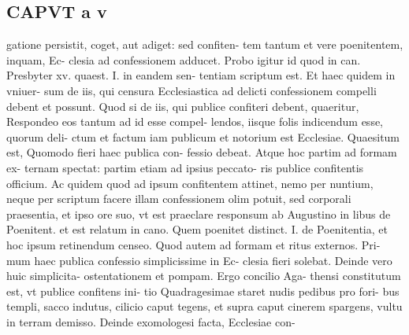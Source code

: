 \documentclass{article}
\begin{document}
\begin{pages}
\section*{CAPVT a v }
\marginpar{[ p.323 ]}\pstart gatione persistit, coget, aut adiget: sed confiten- tem tantum et vere poenitentem, inquam, Ec- clesia ad confessionem adducet. Probo igitur id quod in can. Presbyter xv. quaest. I. in eandem sen- tentiam scriptum est. Et haec quidem in vniuer- sum de iis, qui censura Ecclesiastica ad delicti confessionem compelli debent et possunt. Quod si de iis, qui publice confiteri debent, quaeritur, Respondeo eos tantum ad id esse compel- lendos, iisque folis indicendum esse, quorum deli- ctum et factum iam publicum et notorium est Ecclesiae. Quaesitum est, Quomodo fieri haec publica con- fessio debeat. Atque hoc partim ad formam ex- ternam spectat: partim etiam ad ipsius peccato- ris publice confitentis officium. Ac quidem quod ad ipsum confitentem attinet, nemo per nuntium, neque per scriptum facere illam confessionem olim potuit, sed corporali praesentia, et ipso ore suo, vt est praeclare responsum ab Augustino in libus  de Poenitent. et est relatum in cano. Quem poenitet distinct. I. de Poenitentia, et hoc ipsum retinendum censeo. Quod autem ad formam et ritus externos. Pri- mum haec publica confessio simplicissime in Ec- clesia fieri solebat. Deinde vero huic simplicita- ostentationem et pompam. Ergo concilio Aga- thensi constitutum est, vt publice confitens ini- tio Quadragesimae staret nudis pedibus pro fori- bus templi, sacco indutus, cilicio caput tegens, et supra caput cinerem spargens, vultu in terram demisso. Deinde exomologesi facta, Ecclesiae con-  \pend

\end{pages}
\end{document}
